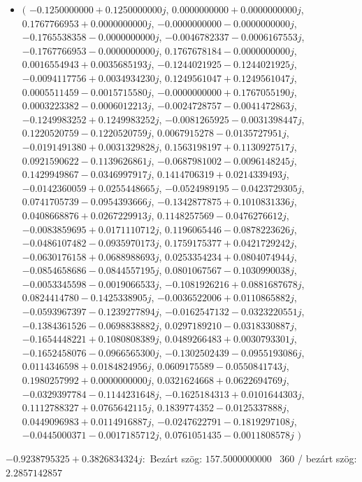 \documentclass[14pt,a4paper]{article}
\begin{document}
\begin{itemize}
\item
$\big($
$-0.1250000000+0.1250000000j$, $0.0000000000+0.0000000000j$, $0.1767766953+0.0000000000j$, $-0.0000000000-0.0000000000j$, $-0.1765538358-0.0000000000j$, $-0.0046782337-0.0006167553j$, $-0.1767766953-0.0000000000j$, $0.1767678184-0.0000000000j$, $0.0016554943+0.0035685193j$, $-0.1244021925-0.1244021925j$, $-0.0094117756+0.0034934230j$, $0.1249561047+0.1249561047j$, $0.0005511459-0.0015715580j$, $-0.0000000000+0.1767055190j$, $0.0003223382-0.0006012213j$, $-0.0024728757-0.0041472863j$, $-0.1249983252+0.1249983252j$, $-0.0081265925-0.0031398447j$, $0.1220520759-0.1220520759j$, $0.0067915278-0.0135727951j$, $-0.0191491380+0.0031329828j$, $0.1563198197+0.1130927517j$, $0.0921590622-0.1139626861j$, $-0.0687981002-0.0096148245j$, $0.1429949867-0.0346997917j$, $0.1414706319+0.0214339493j$, $-0.0142360059+0.0255448665j$, $-0.0524989195-0.0423729305j$, $0.0741705739-0.0954393666j$, $-0.1342877875+0.1010831336j$, $0.0408668876+0.0267229913j$, $0.1148257569-0.0476276612j$, $-0.0083859695+0.0171110712j$, $0.1196065446-0.0878223626j$, $-0.0486107482-0.0935970173j$, $0.1759175377+0.0421729242j$, $-0.0630176158+0.0688988693j$, $0.0253354234+0.0804074944j$, $-0.0854658686-0.0844557195j$, $0.0801067567-0.1030990038j$, $-0.0053345598-0.0019066533j$, $-0.1081926216+0.0881687678j$, $0.0824414780-0.1425338905j$, $-0.0036522006+0.0110865882j$, $-0.0593967397-0.1239277894j$, $-0.0162547132-0.0323220551j$, $-0.1384361526-0.0698838882j$, $0.0297189210-0.0318330887j$, $-0.1654448221+0.1080808389j$, $0.0489266483+0.0030793301j$, $-0.1652458076-0.0966565300j$, $-0.1302502439-0.0955193086j$, $0.0114346598+0.0184824956j$, $0.0609175589-0.0550841743j$, $0.1980257992+0.0000000000j$, $0.0321624668+0.0622694769j$, $-0.0329397784-0.1144231648j$, $-0.1625184313+0.0101644303j$, $0.1112788327+0.0765642115j$, $0.1839774352-0.0125337888j$, $0.0449096983+0.0114916887j$, $-0.0247622791-0.1819297108j$, $-0.0445000371-0.0017185712j$, $0.0761051435-0.0011808578j$
$\big)$
\end{itemize}
$-0.9238795325+0.3826834324j$:\
Bezárt szög: $157.5000000000$ \
360 / bezárt szög: $2.2857142857$\
\end{document}
